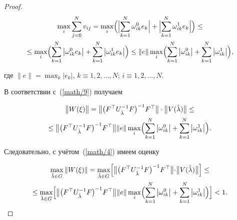 \begin{proof}
\begin{multline*}
\max_i \sum_{j=0}^{N}v_{ij}=\max_i \Bigl( \Bigl|\sum_{k=1}^{N}\omega^{0}_{ik}e_k\Bigr|+\Bigl|\sum_{k=1}^{N}\omega^{1}_{ik}e_k\Bigr| \Bigr) \leq \\ \leq 

    \max_i \Bigl( \sum_{k=1}^{N}\left|\omega^{0}_{ik}e_k\right|+\sum_{k=1}^{N}\left|\omega^{1}_{ik}e_k\right| \Bigr) 

    \leq \|e\|\max_i \Bigl( \sum_{k=1}^{N}\left|\omega^{0}_{ik}\right|+\sum_{k=1}^{N}\left|\omega^{1}_{ik}\right| \Bigr) , 

\end{multline*}

    где $\|e\|=\max_k |e_k|$, $k\equiv 1, 2, \ldots, N$; $i\equiv1, 2, \ldots, N.$

    

В соответствии с~(\ref{math/9}) получаем

\begin{multline*}

\bigl\|W( \xi ) \bigr\|=\bigl\|\bigl( F^{\top}U^{-1}_{\hat{\lambda}}F \bigr) ^{-1}F^{\top}\bigr\| \cdot 

\bigl\|V( \hat{\lambda} ) \bigr\|\leq \\ 

\leq \bigl\|\bigl( F^{\top}U^{-1}_{\hat{\lambda}}F \bigr) ^{-1}F^{\top}\bigr\| \|e\| 

\max_i \Bigl( \sum_{k=1}^{N}\left|\omega^{0}_{ik}\right|+\sum_{k=1}^{N}\left|\omega^{1}_{ik}\right| \Bigr) .

\end{multline*}

Следовательно,  с учётом~(\ref{math/4}) имеем оценку

\begin{multline*}

\max_{\hat{\lambda}\in G} \left\|W( \xi ) \right\|=

\max_{\hat{\lambda}\in G} \Bigl[\bigl\|\bigl( F^{\top}U^{-1}_{\hat{\lambda}}F \bigr) ^{-1}F^{\top}\bigr\| \cdot 

\bigr\|V( \hat{\lambda} ) \bigr\|\Bigr]\leq \\

\leq \max_{\hat{\lambda}\in G} \Bigr[\bigr\| \bigr( F^{\top}U^{-1}_{\hat{\lambda}}F \bigl) ^{-1}F^{\top}\bigr\| \|e\|\max_i 

\Bigl( \sum_{k=1}^{N}\left|\omega^{0}_{ik}\right|+\sum_{k=1}^{N}\left|\omega^{1}_{ik}\right| \Bigr) \Bigr]<1.

\end{multline*}


\end{proof}
